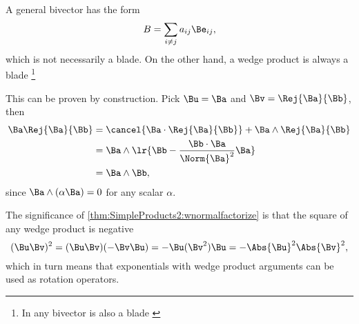 %
%
A general bivector has the form
\begin{equation}\label{eqn:normalFactorization:1800}
B = \sum_{i \ne j} a_{ij} \Be_{ij},
\end{equation}
which is not necessarily a blade.
On the other hand, a wedge product is always a blade
\footnote{In  any bivector is also a blade \citep{ablamowicz2004lectures:chapter1}}


This can be proven by construction.
Pick \( \Bu = \Ba \) and \( \Bv = \Rej{\Ba}{\Bb} \), then
\begin{equation}\label{eqn:normalFactorization:1840}
\begin{aligned}
\Ba \Rej{\Ba}{\Bb}
&= \cancel{\Ba \cdot \Rej{\Ba}{\Bb}} + \Ba \wedge \Rej{\Ba}{\Bb} \\
&= \Ba \wedge \lr{ \Bb - \frac{\Bb \cdot \Ba}{\Norm{\Ba}^2} \Ba } \\
&= \Ba \wedge \Bb,
\end{aligned}
\end{equation}
since \( \Ba \wedge (\alpha \Ba) = 0 \) for any scalar \( \alpha \).

The significance of \cref{thm:SimpleProducts2:wnormalfactorize} is that the square of any wedge product is negative
\begin{dmath}\label{eqn:normalFactorization:1820}
(\Bu \Bv)^2
=
(\Bu \Bv) (-\Bv \Bu)
=
-\Bu (\Bv^2) \Bu
=
- \Abs{\Bu}^2 \Abs{\Bv}^2,
\end{dmath}
which in turn means that exponentials with wedge product arguments can be used as rotation operators.


